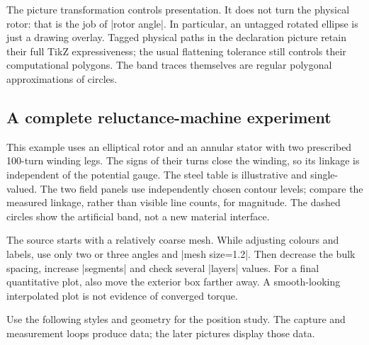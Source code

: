 \begin{codeexample}
\end{codeexample}
The picture transformation controls presentation. It does not turn the physical
rotor: that is the job of |rotor angle|. In particular, an untagged rotated
ellipse is just a drawing overlay. Tagged physical paths in the declaration
picture retain their full TikZ expressiveness; the usual flattening tolerance
still controls their computational polygons. The band traces themselves are
regular polygonal approximations of circles.

\subsection{A complete reluctance-machine experiment}
This example uses an elliptical rotor and an annular stator with two prescribed
100-turn winding legs. The signs of their turns close the winding, so its
linkage is independent of the potential gauge. The steel table is illustrative
and single-valued. The two field panels use independently chosen contour levels;
compare the measured linkage, rather than visible line counts, for magnitude.
The dashed circles show the artificial band, not a new material interface.

The source starts with a relatively coarse mesh. While adjusting colours and
labels, use only two or three angles and |mesh size=1.2|. Then decrease
the bulk spacing, increase |segments| and check several |layers| values.
For a final quantitative plot, also move the exterior box farther away.
A smooth-looking interpolated plot is not evidence of converged torque.


Use the following styles and geometry for the position study. The capture and measurement loops produce data; the later pictures display those data.

